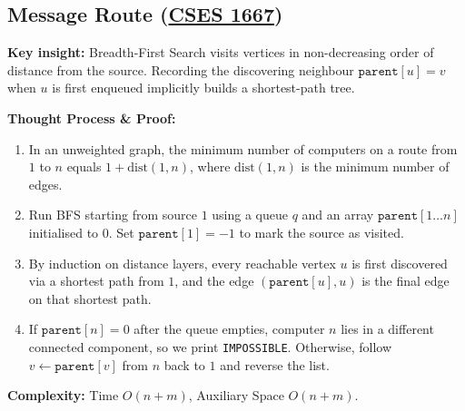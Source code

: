 \documentclass[11pt]{article}
\newcommand{\insight}[1]{\par\medskip\noindent\textbf{Key insight:} #1\par\smallskip}
\begin{document}
\subsection{Message Route (\href{https://cses.fi/problemset/task/1667}{CSES 1667})}

\insight{Breadth-First Search visits vertices in non-decreasing order of distance from the source. Recording the discovering neighbour $\texttt{parent}[u] = v$ when $u$ is first enqueued implicitly builds a shortest-path tree.}

\textbf{Thought Process \& Proof:}
\begin{enumerate}
    \item In an unweighted graph, the minimum number of computers on a route from $1$ to $n$ equals $1 + \text{dist}(1, n)$, where $\text{dist}(1, n)$ is the minimum number of edges.
    \item Run BFS starting from source $1$ using a queue $q$ and an array $\texttt{parent}[1\dots n]$ initialised to $0$. Set $\texttt{parent}[1] = -1$ to mark the source as visited.
    \item By induction on distance layers, every reachable vertex $u$ is first discovered via a shortest path from $1$, and the edge $(\texttt{parent}[u], u)$ is the final edge on that shortest path.
    \item If $\texttt{parent}[n] = 0$ after the queue empties, computer $n$ lies in a different connected component, so we print \texttt{IMPOSSIBLE}. Otherwise, follow $v \leftarrow \texttt{parent}[v]$ from $n$ back to $1$ and reverse the list.
\end{enumerate}

\textbf{Complexity:} Time $O(n + m)$, Auxiliary Space $O(n + m)$.
\end{document}
